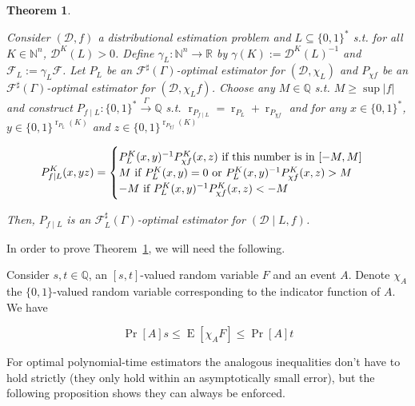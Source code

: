 \documentclass{article}
\numberwithin{equation}{section}
\theoremstyle{definition}
\theoremstyle{plain}
\newtheorem{theorem}{Theorem}[section]
\newcommand{\Bool}{\{0,1\}}
\newcommand{\Words}{{\Bool^*}}
\DeclareMathOperator{\Prb}{Pr}
\DeclareMathOperator{\E}{E}
\DeclareMathOperator{\R}{r}
\newcommand{\Nats}{\mathbb{N}}
\newcommand{\Rats}{\mathbb{Q}}
\newcommand{\Reals}{\mathbb{R}}
\newcommand{\NatFun}{\Nats^n \rightarrow}
\newcommand{\Abs}[1]{\lvert #1 \rvert}
\newcommand{\Dist}{\mathcal{D}}
\newcommand{\Fall}{\mathcal{F}}
\newcommand{\ESG}{\Fall^\sharp(\Gamma)}
\newcommand{\BoolR}[1]{\Bool^{\R_{#1}(K)}}
\newcommand{\Scheme}{\xrightarrow{\Gamma}}
\begin{document}
\begin{samepage}
\begin{theorem}
\label{thm:cond}

Consider $(\Dist, f)$ a distributional estimation problem and ${L \subseteq \Words}$ s.t. for all $K \in \Nats^n$, $\Dist^K(L) > 0$. Define $\gamma_L: \NatFun \Reals$ by $\gamma(K):=\Dist^{K}(L)^{-1}$ and $\Fall_L:=\gamma_L \Fall$. Let $P_L$ be an $\ESG$-optimal estimator for $(\Dist, \chi_L)$ and $P_{\chi f}$ be an $\ESG$-optimal estimator for $(\Dist, \chi_L f)$. Choose any $M \in \Rats$ s.t. ${M \geq \sup \Abs{f}}$ and construct $P_{f \mid L}: \Words \Scheme \Rats$ s.t. $\R_{P_{f \mid L}} = \R_{P_L} + \R_{P_{\chi f}}$ and for any ${x \in \Words}$, ${y \in \BoolR{P_L}}$ and $z \in \BoolR{P_{\chi f}}$ 

\begin{equation}
P_{f \mid L}^K(x,yz)=\begin{cases}P_L^K(x,y)^{-1} P_{\chi f}^K(x,z) \textnormal{ if this number is in } [-M,M] \\ M \textnormal{ if } P_L^K(x,y)=0 \textnormal{ or } P_L^K(x,y)^{-1} P_{\chi f}^K(x,z) > M\\ -M \textnormal{ if } P_L^K(x,y)^{-1} P_{\chi f}^K(x,z) < -M\end{cases}
\end{equation}

Then, $P_{f \mid L}$ is an $\Fall_L^\sharp(\Gamma)$-optimal estimator for $(\Dist \mid L, f)$.

\end{theorem}
\end{samepage}

In order to prove Theorem~\ref{thm:cond}, we will need the following.

Consider $s,t \in \Rats$, an $[s,t]$-valued random variable $F$ and an event $A$. Denote $\chi_A$ the $\Bool$-valued random variable corresponding to the indicator function of $A$. We have 

\begin{equation}
\Prb[A]s \leq \E[\chi_A F] \leq \Prb[A]t
\end{equation}

For optimal polynomial-time estimators the analogous inequalities don't have to hold strictly (they only hold within an asymptotically small error), but the following proposition shows they can always be enforced.
\end{document}
